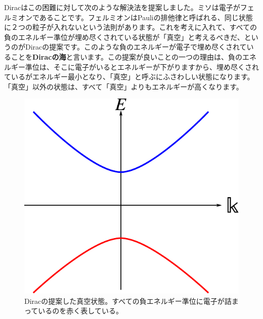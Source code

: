 \documentclass[report,paper=a4, fontsize=12pt, line_length=16cm, number_of_lines=33,dvipdfmx]{jlreq}
\numberwithin{equation}{chapter}
\newcommand{\strong}[1]{{\sffamily \bfseries #1}}
\begin{document}
Diracはこの困難に対して次のような解決法を提案しました。ミソは電子がフェルミオンであることです。フェルミオンはPauliの排他律と呼ばれる、同じ状態に２つの粒子が入れないという法則があります。これを考えに入れて、すべての負のエネルギー準位が埋め尽くされている状態が「真空」と考えるべきだ、というのがDiracの提案です。このような負のエネルギーが電子で埋め尽くされていることを\strong{Diracの海}と言います。この提案が良いことの一つの理由は、負のエネルギー準位は、そこに電子がいるとエネルギーが下がりますから、埋め尽くされているがエネルギー最小となり、「真空」と呼ぶにふさわしい状態になります。「真空」以外の状態は、すべて「真空」よりもエネルギーが高くなります。
\begin{figure}[htbp]
  \centering
  \includegraphics{diracsea.pdf}
  \caption{Diracの提案した真空状態。すべての負エネルギー準位に電子が詰まっているのを赤く表している。}
  \label{fig:diracsea}
\end{figure}
\end{document}
